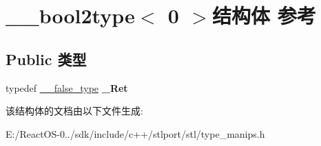 \hypertarget{struct____bool2type_3_010_01_4}{}\section{\+\_\+\+\_\+bool2type$<$ 0 $>$结构体 参考}
\label{struct____bool2type_3_010_01_4}
\subsection*{Public 类型}
\begin{DoxyCompactItemize}
\item 
\mbox{\label{struct____bool2type_3_010_01_4_a52f039f50bcba1574870fdb23c60a9e1}} 
typedef \hyperlink{struct____false__type}{\+\_\+\+\_\+false\+\_\+type} {\bfseries \+\_\+\+Ret}
\end{DoxyCompactItemize}


该结构体的文档由以下文件生成\+:\begin{DoxyCompactItemize}
\item 
E\+:/\+React\+O\+S-\/0../sdk/include/c++/stlport/stl/type\+\_\+manips.\+h\end{DoxyCompactItemize}
